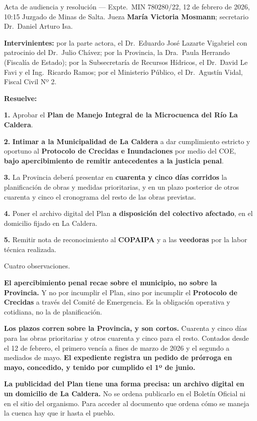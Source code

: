 \begin{ficha}{Acta de audiencia y resolución --- Expte.\ MIN 780280/22, 12 de febrero de 2026, 10:15}
Juzgado de Minas de Salta. Jueza \textbf{María Victoria Mosmann}; secretario Dr.\ Daniel
Arturo Isa.

\textbf{Intervinientes:} por la parte actora, el Dr.\ Eduardo José Lazarte Vigabriel con
patrocinio del Dr.\ Julio Chávez; por la Provincia, la Dra.\ Paula Herrando (Fiscalía de
Estado); por la Subsecretaría de Recursos Hídricos, el Dr.\ David Le Favi y el Ing.\ Ricardo
Ramos; por el Ministerio Público, el Dr.\ Agustín Vidal, Fiscal Civil Nº 2.

\textbf{Resuelve:}

\textbf{1.} Aprobar el \textbf{Plan de Manejo Integral de la Microcuenca del Río La Caldera}.

\textbf{2.} \textbf{Intimar a la Municipalidad de La Caldera} a dar cumplimiento estricto y
oportuno al \textbf{Protocolo de Crecidas e Inundaciones} por medio del COE, \textbf{bajo
apercibimiento de remitir antecedentes a la justicia penal}.

\textbf{3.} La Provincia deberá presentar en \textbf{cuarenta y cinco días corridos} la
planificación de obras y medidas prioritarias, y en un plazo posterior de otros cuarenta y
cinco el cronograma del resto de las obras previstas.

\textbf{4.} Poner el archivo digital del Plan \textbf{a disposición del colectivo afectado},
en el domicilio fijado en La Caldera.

\textbf{5.} Remitir nota de reconocimiento al \textbf{COPAIPA} y a las \textbf{veedoras} por la
labor técnica realizada.
\end{ficha}

Cuatro observaciones.

\textbf{El apercibimiento penal recae sobre el municipio, no sobre la Provincia.} Y no por
incumplir el Plan, sino por incumplir el \textbf{Protocolo de Crecidas} a través del Comité de
Emergencia. Es la obligación operativa y cotidiana, no la de planificación.

\textbf{Los plazos corren sobre la Provincia, y son cortos.} Cuarenta y cinco días para las
obras prioritarias y otros cuarenta y cinco para el resto. Contados desde el 12 de febrero,
el primero vencía a fines de marzo de 2026 y el segundo a mediados de mayo. \textbf{El
expediente registra un pedido de prórroga en mayo, concedido, y tenido por cumplido el 1º de
junio.}

\textbf{La publicidad del Plan tiene una forma precisa: un archivo digital en un domicilio de
La Caldera.} No se ordena publicarlo en el Boletín Oficial ni en el sitio del organismo. Para
acceder al documento que ordena cómo se maneja la cuenca hay que ir hasta el pueblo.

